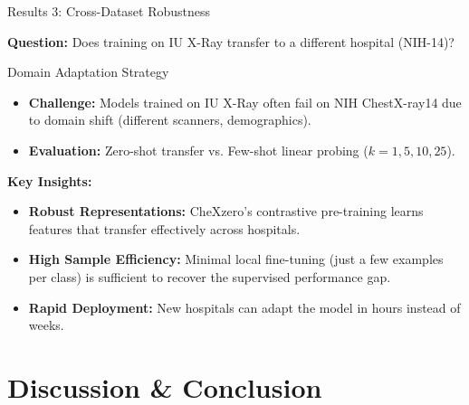 \documentclass[aspectratio=169]{beamer}
\begin{document}
\begin{frame}{Results 3: Cross-Dataset Robustness}
  
  \textbf{Question:} Does training on IU X-Ray transfer to a different hospital (NIH-14)?
  
  \vspace{0.3cm}
  
  \begin{block}{Domain Adaptation Strategy}
    \begin{itemize}
      \item \textbf{Challenge:} Models trained on IU X-Ray often fail on NIH ChestX-ray14 due to domain shift (different scanners, demographics).
      \item \textbf{Evaluation:} Zero-shot transfer vs. Few-shot linear probing ($k=1, 5, 10, 25$).
    \end{itemize}
  \end{block}
  
  \vspace{0.3cm}
  
  \textbf{Key Insights:}
  \begin{itemize}
      \item \textbf{Robust Representations:} CheXzero's contrastive pre-training learns features that transfer effectively across hospitals.
      \item \textbf{High Sample Efficiency:} Minimal local fine-tuning (just a few examples per class) is sufficient to recover the supervised performance gap.
      \item \textbf{Rapid Deployment:} New hospitals can adapt the model in hours instead of weeks.
  \end{itemize}
  
\end{frame}

\section{Discussion \& Conclusion}
\end{document}
